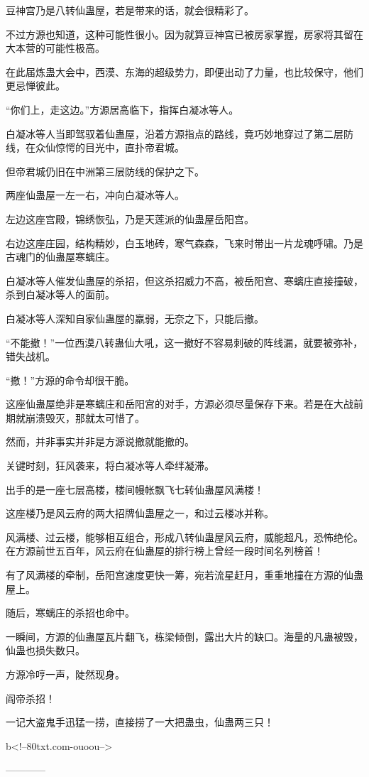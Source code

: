 \begin{this_body}
豆神宫乃是八转仙蛊屋，若是带来的话，就会很精彩了。

不过方源也知道，这种可能性很小。因为就算豆神宫已被房家掌握，房家将其留在大本营的可能性极高。

在此届炼蛊大会中，西漠、东海的超级势力，即便出动了力量，也比较保守，他们更忌惮彼此。

“你们上，走这边。”方源居高临下，指挥白凝冰等人。

白凝冰等人当即驾驭着仙蛊屋，沿着方源指点的路线，竟巧妙地穿过了第二层防线，在众仙惊愕的目光中，直扑帝君城。

但帝君城仍旧在中洲第三层防线的保护之下。

两座仙蛊屋一左一右，冲向白凝冰等人。

左边这座宫殿，锦绣恢弘，乃是天莲派的仙蛊屋岳阳宫。

右边这座庄园，结构精妙，白玉地砖，寒气森森，飞来时带出一片龙魂呼啸。乃是古魂门的仙蛊屋寒螭庄。

白凝冰等人催发仙蛊屋的杀招，但这杀招威力不高，被岳阳宫、寒螭庄直接撞破，杀到白凝冰等人的面前。

白凝冰等人深知自家仙蛊屋的羸弱，无奈之下，只能后撤。

“不能撤！”一位西漠八转蛊仙大吼，这一撤好不容易刺破的阵线漏，就要被弥补，错失战机。

“撤！”方源的命令却很干脆。

这座仙蛊屋绝非是寒螭庄和岳阳宫的对手，方源必须尽量保存下来。若是在大战前期就崩溃毁灭，那就太可惜了。

然而，并非事实并非是方源说撤就能撤的。

关键时刻，狂风袭来，将白凝冰等人牵绊凝滞。

出手的是一座七层高楼，楼间幔帐飘飞七转仙蛊屋风满楼！

这座楼乃是风云府的两大招牌仙蛊屋之一，和过云楼冰并称。

风满楼、过云楼，能够相互组合，形成八转仙蛊屋风云府，威能超凡，恐怖绝伦。在方源前世五百年，风云府在仙蛊屋的排行榜上曾经一段时间名列榜首！

有了风满楼的牵制，岳阳宫速度更快一筹，宛若流星赶月，重重地撞在方源的仙蛊屋上。

随后，寒螭庄的杀招也命中。

一瞬间，方源的仙蛊屋瓦片翻飞，栋梁倾倒，露出大片的缺口。海量的凡蛊被毁，仙蛊也损失数只。

方源冷哼一声，陡然现身。

阎帝杀招！

一记大盗鬼手迅猛一捞，直接捞了一大把蛊虫，仙蛊两三只！

b<!--80txt.com-ouoou-->

------------

\end{this_body}

